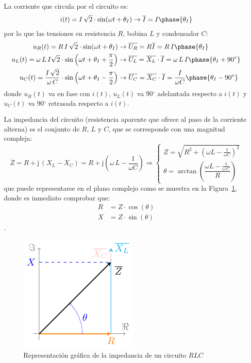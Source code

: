 	La corriente que circula por el circuito es:
	\begin{equation*}
		i(t)=I\,\sqrt{2}\cdot\sin(\omega t+\theta_I)\rightarrow\overline{I}=I\phase{\theta_I}
	\end{equation*}
	por lo que las tensiones en resistencia $R$, bobina $L$ y condensador $C$:
	\begin{align*}
		u_R(t)=R\, I\,\sqrt{2}\cdot\sin(\omega t+\theta_I)&\rightarrow \overline{U_R} = R \overline{I}=R\,I\phase{\theta_I}\\ 
		u_L(t)= \omega\,L\,I \sqrt{2}\cdot \sin \left(\omega t+\theta_I+\frac{\pi}{2}\right)&\rightarrow \overline{U_L}=\overline{X_L}\cdot\overline{I}= \omega\,L\,I\phase{\theta_I+90^\circ}\\
		u_C(t)=\dfrac{I\,\sqrt{2}}{\omega\,C} \cdot \sin \left(\omega t+\theta_I-\frac{\pi}{2}\right)&\rightarrow \overline{U_C}=\overline{X_C}\cdot\overline{I}=\dfrac{I}{\omega C}\phase{\theta_I-90^\circ}
	\end{align*}
	donde $u_R(t)$ va en fase con $i(t)$, $u_L(t)$ va 90$^\circ$ adelantada respecto a $i(t)$ y $u_C(t)$ va 90$^\circ$ retrasada respecto a $i(t)$. 
	
	La impedancia del circuito (resistencia aparente que ofrece al paso de la corriente alterna) es el conjunto de $R$, $L$ y $C$, que se corresponde con una magnitud compleja: 
	\begin{equation}
		\boxed{ \overline{Z} = R + \mathrm{j}\,(X_L-X_C) = R+ \mathrm{j}\left(\omega\,L-\dfrac{1}{\omega C}\right) \Rightarrow 
			\begin{cases}
				Z=\sqrt{R^2+\left(\omega L -\frac{1}{\omega C} \right)^2}\\
				\theta=\arctan\left(\dfrac{\omega L-\frac{1}{\omega\,C}}{R} \right)
		\end{cases}}
	\end{equation}
	que puede representarse en el plano complejo como se muestra en la Figura~\ref{fig.fasorRLC}, donde es inmediato comprobar que:
	\begin{align*}
		R&=Z\cdot\cos(\theta)\\
		X&=Z\cdot\sin(\theta)
	\end{align*}. 
	\begin{figure}[H]
		\centering
		\includegraphics{../figs/fasorRLC.pdf}
		\caption{Representación gráfica de la impedancia de un circuito $RLC$}
		\label{fig.fasorRLC}
	\end{figure}
	
